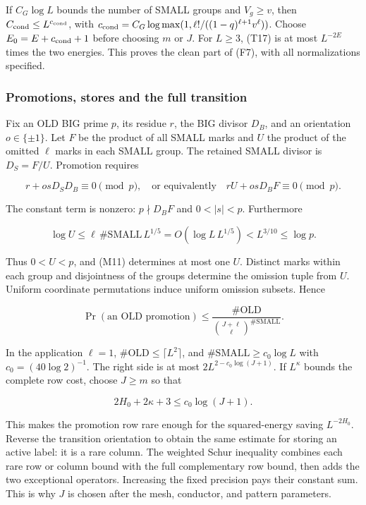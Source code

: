 If \(C_G\log L\) bounds the number of SMALL groups and \(V_g\ge v\),
then \(C_{\rm cond}\le L^{c_{\rm cond}}\), with
\(c_{\rm cond}=C_G\log\max(1,\ell!/((1-q)^{\ell+1}v^\ell))\). Choose
\(E_0=E+c_{\rm cond}+1\) before choosing \(m\) or \(J\). For \(L\ge3\),
(T17) is at most \(L^{-2E}\) times the two energies. This proves the
clean part of (F7), with all normalizations specified.


\hypertarget{marked-correlation-promotions-stores-and-the-full-transition}{%
\subsubsection{Promotions, stores and the full
transition}\label{marked-correlation-promotions-stores-and-the-full-transition}}

Fix an OLD BIG prime \(p\), its residue \(r\), the BIG divisor \(D_B\),
and an orientation \(o\in\{\pm1\}\). Let \(F\) be the product of all
SMALL marks and \(U\) the product of the omitted \(\ell\) marks in each
SMALL group. The retained SMALL divisor is \(D_S=F/U\). Promotion
requires

\[
r+osD_SD_B\equiv0\pmod p,
\quad\text{or equivalently}\quad
rU+osD_BF\equiv0\pmod p. \tag{M11}
\]

The constant term is nonzero: \(p\nmid D_BF\) and \(0<|s|<p\).
Furthermore

\[
\log U\le\ell\,\#\mathrm{SMALL}\,L^{1/5}
 =O(\log L\,L^{1/5})<L^{3/10}\le\log p.
\]

Thus \(0<U<p\), and (M11) determines at most one \(U\). Distinct marks
within each group and disjointness of the groups determine the omission
tuple from \(U\). Uniform coordinate permutations induce uniform
omission subsets. Hence

\[
\Pr(\text{an OLD promotion})
\le\frac{\#\mathrm{OLD}}
 {\binom{J+\ell}{\ell}^{\#\mathrm{SMALL}}}. \tag{M12}
\]

In the application \(\ell=1\), \(\#\mathrm{OLD}\le\lceil L^2\rceil\),
and \(\#\mathrm{SMALL}\ge c_0\log L\) with \(c_0=(40\log2)^{-1}\). The
right side is at most \(2L^{2-c_0\log(J+1)}\). If \(L^\kappa\) bounds
the complete row cost, choose \(J\ge m\) so that

\[
2H_0+2\kappa+3\le c_0\log(J+1). \tag{M13}
\]

This makes the promotion row rare enough for the squared-energy saving
\(L^{-2H_0}\). Reverse the transition orientation to obtain the same
estimate for storing an active label: it is a rare column. The weighted
Schur inequality combines each rare row or column bound with the full
complementary row bound, then adds the two exceptional operators.
Increasing the fixed precision pays their constant sum. This is why
\(J\) is chosen after the mesh, conductor, and pattern parameters.

